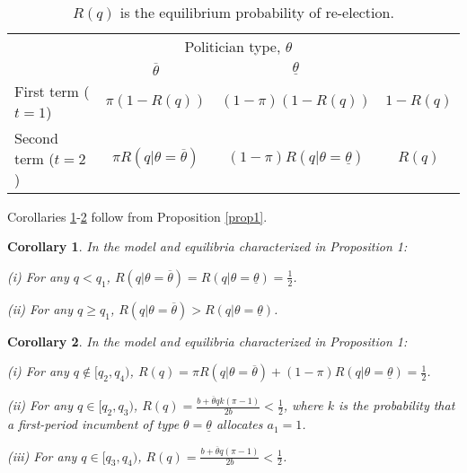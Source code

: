 \documentclass[11pt,english]{article}
\newtheorem{cor}{Corollary}
\begin{document}
\begin{table}[H]
\centering
\begin{tabular}{l|c|c|c} 
\multicolumn{1}{c}{}&\multicolumn{2}{c}{Politician type, $\theta$}\\
\multicolumn{1}{c}{}& \multicolumn{1}{c}{$\overline{\theta}$} & \multicolumn{1}{c}{$\underline{\theta}$}\\ \cline{2-3}
First term ($t = 1$) & $\pi(1-R(q))$ & $(1-\pi)(1-R(q))$ & $1-R(q)$ \\ \cline{2-3}
Second term ($t=2$) & $\pi R(q|\theta = \overline{\theta})$ & $(1-\pi) R(q|\theta = \underline{\theta})$ & $R(q)$\\ \cline{2-3}

\end{tabular}
\caption{$R(q)$ is the equilibrium probability of re-election.}\label{tab:props}
\end{table}

Corollaries \ref{cor1}-\ref{cor2} follow from Proposition \ref{prop1}. 



\begin{cor}\label{cor1}
In the model and equilibria characterized in Proposition 1:

\hspace{1cm} (i) For any $q < q_1$, $R(q|\theta = \overline{\theta})=R(q|\theta=\underline{\theta}) = \frac{1}{2}$.

\hspace{1cm}(ii) For any $q\geq q_1$, $R(q|\theta = \overline{\theta})>R(q|\theta=\underline{\theta})$.
\end{cor}

\begin{cor}\label{cor2}
In the model and equilibria characterized in Proposition 1:

\hspace{1cm} (i) For any $q \notin [q_2, q_4)$, $R(q)= \pi R(q|\theta = \overline{\theta})+ (1-\pi)R(q|\theta = \underline{\theta})=\frac{1}{2}$. 

\hspace{1cm} (ii) For any $q \in [q_2, q_3)$, $R(q) = \frac{b + \overline{\theta} q k (\pi - 1)}{2b}<\frac{1}{2}$, where $k$ is the probability that a first-period incumbent of type $\theta = \underline{\theta}$ allocates $a_1 = 1$.

\hspace{1cm}(iii) For any $q \in [q_3, q_4)$, $R(q) = \frac{b + \overline{\theta} q (\pi - 1)}{2b}<\frac{1}{2}$.
\end{cor}
\end{document}
